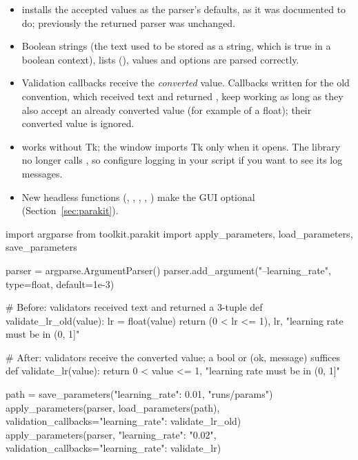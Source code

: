\begin{itemize}
  \item {} installs the accepted values as the parser's defaults, as
    it was documented to do; previously the returned parser was unchanged.
  \item Boolean strings (the text  used to be stored as a
    string, which is true in a boolean context), lists (),
     values and  options are parsed correctly.
  \item Validation callbacks receive the \emph{converted} value. Callbacks
    written for the old convention, which received text and returned
    , keep working as long as they
    also accept an already converted value (for example  of
    a float); their converted value is ignored.
  \item {} works without Tk; the window imports Tk
    only when it opens. The library no longer calls
    , so configure logging in your script if you want
    to see its log messages.
  \item New headless functions (,
    , , ,
    ) make the GUI optional
    (Section~\ref{sec:parakit}).
\end{itemize}

\begin{pycode}
import argparse
from toolkit.parakit import apply_parameters, load_parameters, save_parameters

parser = argparse.ArgumentParser()
parser.add_argument("--learning_rate", type=float, default=1e-3)

# Before: validators received text and returned a 3-tuple
def validate_lr_old(value):
    lr = float(value)
    return (0 < lr <= 1), lr, "learning rate must be in (0, 1]"

# After: validators receive the converted value; a bool or (ok, message) suffices
def validate_lr(value):
    return 0 < value <= 1, "learning rate must be in (0, 1]"

path = save_parameters({"learning_rate": 0.01}, "runs/params")
apply_parameters(parser, load_parameters(path),
                 validation_callbacks={"learning_rate": validate_lr_old})
apply_parameters(parser, {"learning_rate": "0.02"},
                 validation_callbacks={"learning_rate": validate_lr})
\end{pycode}

\par\endgroup
